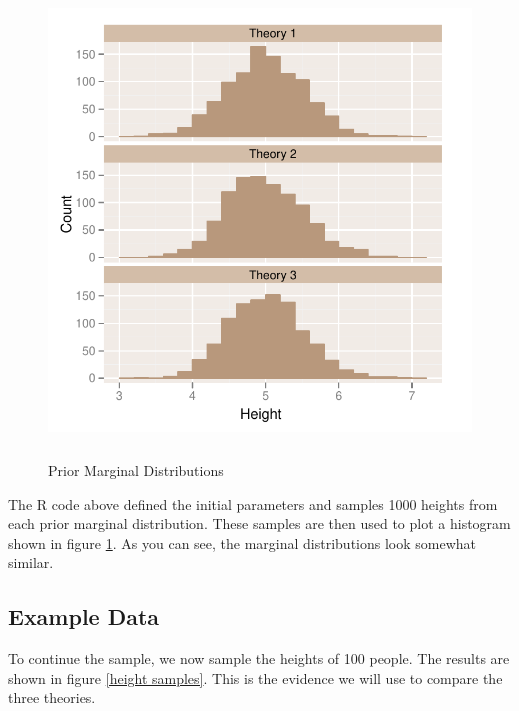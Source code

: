 \documentclass[letterpaper,12pt]{article}
\begin{document}
\begin{figure}\begin{center}\includegraphics[width=12.5cm,height=12.5cm]{favir-graphs/p1.pdf}\caption{Prior Marginal Distributions}\label{prior}\end{center}\end{figure}
The R code above defined the initial parameters and samples 1000
heights from each prior marginal distribution.  These samples are then
used to plot a histogram shown in figure \ref{prior}.  As you can see,
the marginal distributions look somewhat similar.

\clearpage

\subsection{Example Data}

To continue the sample, we now sample the heights of 100 people.  The
results are shown in figure \ref{height samples}.  This is the
evidence we will use to compare the three theories.
\end{document}
